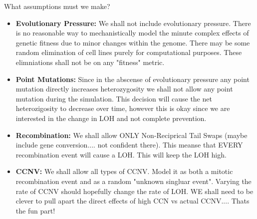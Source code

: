 \documentclass{article}
\begin{document}
    What assumptions must we make?
    \begin{itemize}
        \item \textbf{Evolutionary Pressure:} We shall not include evolutionary pressure.  There is no reasonable way to mechanistically model the minute complex effects of genetic fitness due to minor changes within the genome.  There may be some random elimination of cell lines purely for computational purposes.   These elimniations shall not be on any "fitness" metric.
        \item \textbf{Point Mutations:} Since in the abscense of evolutionary pressure any point mutation directly increases heterozygosity we shall not allow any point mutation during the simulation.  This decision will cause the net heterozigosity to decrease over time, however this is okay since we are interested in the change in LOH and not complete prevention.
        \item \textbf{Recombination:} We shall allow ONLY Non-Reciprical Tail Swaps (maybe include gene conversion.... not confident there).  This meanse that EVERY recombination event will cause a LOH.   This will keep the LOH high.
        \item \textbf{CCNV:}  We shall allow all types of CCNV.   Model it as both a mitotic recombination event and as a random "unknown singluar event".   Varying the rate of CCNV should hopefully change the rate of LOH.   WE shall need to be clever to pull apart the direct effects of high CCN vs actual CCNV....  Thats the fun part!
    \end{itemize}



    
\end{document}
